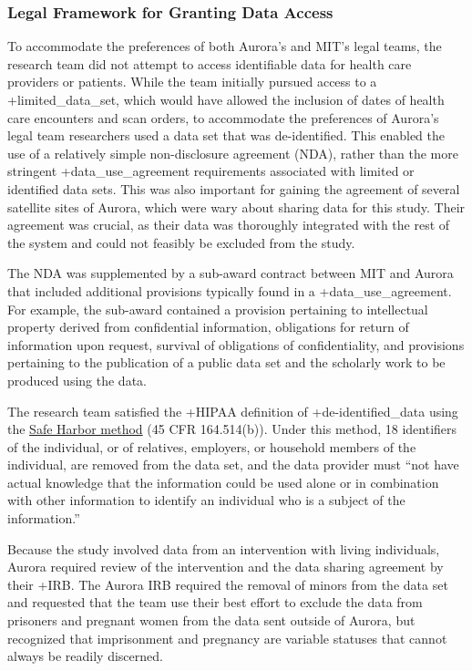 \documentclass[
]{WileySix}
\begin{document}
\hypertarget{legal-framework-for-granting-data-access-4}{%
\subsubsection{Legal Framework for Granting Data Access}\label{legal-framework-for-granting-data-access-4}}

To accommodate the preferences of both Aurora's and MIT's legal teams, the research team did not attempt to access identifiable data for health care providers or patients. While the team initially pursued access to a +limited\_data\_set\textbar, which would have allowed the inclusion of dates of health care encounters and scan orders, to accommodate the preferences of Aurora's legal team researchers used a data set that was de-identified. This enabled the use of a relatively simple non-disclosure agreement (NDA), rather than the more stringent +data\_use\_agreement\textbar{} requirements associated with limited or identified data sets. This was also important for gaining the agreement of several satellite sites of Aurora, which were wary about sharing data for this study. Their agreement was crucial, as their data was thoroughly integrated with the rest of the system and could not feasibly be excluded from the study.

The NDA was supplemented by a sub-award contract between MIT and Aurora that included additional provisions typically found in a +data\_use\_agreement\textbar. For example, the sub-award contained a provision pertaining to intellectual property derived from confidential information, obligations for return of information upon request, survival of obligations of confidentiality, and provisions pertaining to the publication of a public data set and the scholarly work to be produced using the data.

The research team satisfied the +HIPAA\textbar{} definition of +de-identified\_data\textbar{} using the \href{https://www.hhs.gov/hipaa/for-professionals/privacy/special-topics/de-identification/index.html\#safeharborguidance}{Safe Harbor method} (45 CFR 164.514(b)). Under this method, 18 identifiers of the individual, or of relatives, employers, or household members of the individual, are removed from the data set, and the data provider must ``not have actual knowledge that the information could be used alone or in combination with other information to identify an individual who is a subject of the information.''

Because the study involved data from an intervention with living individuals, Aurora required review of the intervention and the data sharing agreement by their +IRB\textbar. The Aurora IRB required the removal of minors from the data set and requested that the team use their best effort to exclude the data from prisoners and pregnant women from the data sent outside of Aurora, but recognized that imprisonment and pregnancy are variable statuses that cannot always be readily discerned.
\end{document}
